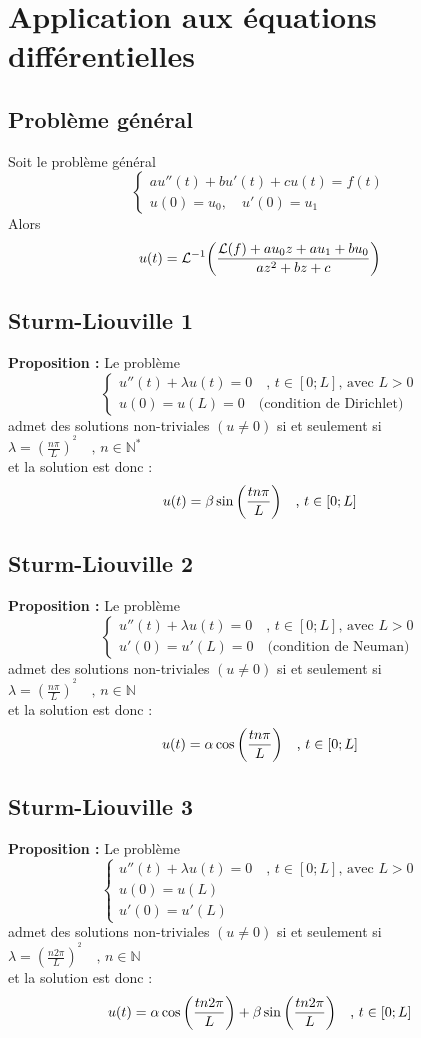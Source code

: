 \section{Application aux équations différentielles}
\subsection{Problème général}
Soit le problème général
$$
\begin{cases}
    au''(t)+bu'(t)+cu(t)=f(t) \\
    u(0)=u_0,\quad u'(0)=u_1
\end{cases}
$$
Alors
$$u(t) = \mathcal{L}^{-1}\bigg{(}\frac{\mathcal{L}(f)+au_0z+au_1+bu_0}{az^2+bz+c}\bigg{)}$$

\subsection{Sturm-Liouville 1}
\textbf{Proposition :} Le problème
$$
\begin{cases}
    u''(t)+\lambda u(t)=0\quad \text{, }t \in [0;L] \text{, avec } L > 0 \\
    u(0) = u(L) = 0 \quad \text{(condition de Dirichlet)}
\end{cases}
$$
admet des solutions non-triviales $(u\neq0)$ si et seulement si $\lambda=(\frac{n\pi}{L})^{^2} \quad \text{, }n \in \mathbb{N}^*$ \\
et la solution est donc :
$$u(t) = \beta \sin \bigg{(} \frac{tn\pi}{L} \bigg{)} \quad \text{, } t \in [0;L]$$

\subsection{Sturm-Liouville 2}
\textbf{Proposition :} Le problème
$$
\begin{cases}
    u''(t)+\lambda u(t)=0\quad \text{, }t \in [0;L] \text{, avec } L > 0 \\
    u'(0) = u'(L) = 0 \quad \text{(condition de Neuman)}
\end{cases}
$$
admet des solutions non-triviales $(u\neq0)$ si et seulement si $\lambda=(\frac{n\pi}{L})^{^2} \quad \text{, }n \in \mathbb{N}$ \\
et la solution est donc :
$$u(t) = \alpha \cos \bigg{(} \frac{tn\pi}{L} \bigg{)} \quad \text{, } t \in [0;L]$$

\subsection{Sturm-Liouville 3}
\textbf{Proposition :} Le problème
$$
\begin{cases}
    u''(t)+\lambda u(t)=0\quad \text{, }t \in [0;L] \text{, avec } L > 0 \\
    u(0) = u(L) \\
    u'(0) = u'(L)
\end{cases}
$$
admet des solutions non-triviales $(u\neq0)$ si et seulement si $\lambda=(\frac{n2\pi}{L})^{^2} \quad \text{, }n \in \mathbb{N}$ \\
et la solution est donc :
$$u(t) = \alpha \cos \bigg{(} \frac{tn2\pi}{L} \bigg{)} + \beta \sin \bigg{(} \frac{tn2\pi}{L} \bigg{)} \quad \text{, } t \in [0;L]$$